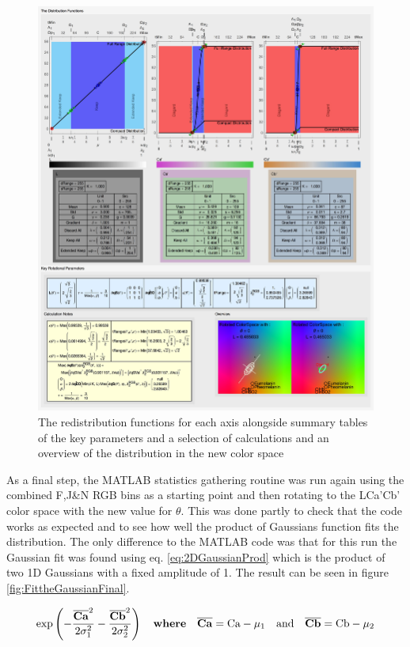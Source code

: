 \begin{figure}[h!]
  \centering
  \includegraphics[width=1.0 \textwidth]{Chapter3/Figs/Distribution_Results.jpg} 
    \caption{ The redistribution functions for each axis alongside summary tables of the key parameters and a selection of calculations and an overview of the distribution in the new color space  }  \label{fig:DistributionResults}
\end{figure}

As a final step, the MATLAB statistics gathering routine was run again using the combined F,J\&N RGB bins as a starting point and then rotating to the LCa'Cb' color space with the new value for $\theta$. This was done partly to check that the code works as expected and to see how well the product of Gaussians function fits the distribution. The only difference to the MATLAB code was that for this run the Gaussian fit was found using eq. \ref{eq:2DGaussianProd} which is the product of two 1D Gaussians with a fixed amplitude of 1. The result can be seen in figure \ref{fig:FittheGaussianFinal}. 

\begin{equation}\label{eq:2DGaussianProd}
\exp \left( -\frac{{\overline{\mathbf{Ca}}}^2}{2 \sigma_1^2} -  \frac{ { \overline{\mathbf{Cb}} }^2}{2 \sigma_2^2} \right) \quad \textbf{where} \quad \overline{\mathbf{Ca}} = \text{Ca}-\mu_1 \quad \text{and} \quad \overline{\mathbf{Cb}} = \text{Cb}-\mu_2 
\end{equation}



